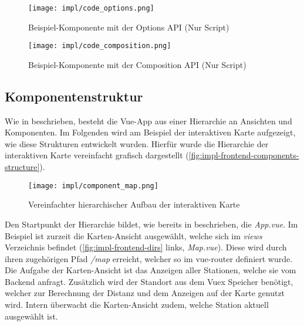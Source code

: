 \begin{figure}[hp]
    \centering
    \texttt{[image: impl/code\_options.png]}
    \caption{Beispiel-Komponente mit der Options API (Nur Script)}
    \label{fig:impl-frontend-vue-api-options}
\end{figure}

\begin{figure}[hp]
    \centering
    \texttt{[image: impl/code\_composition.png]}
    \caption{Beispiel-Komponente mit der Composition API (Nur Script)}
    \label{fig:impl-frontend-vue-api-composition}
\end{figure}


\subsection{Komponentenstruktur}

Wie in  beschrieben, besteht die Vue-App
aus einer Hierarchie an Ansichten und Komponenten. Im Folgenden wird am Beispiel
der interaktiven Karte aufgezeigt, wie diese Strukturen entwickelt wurden.
Hierfür wurde die Hierarchie der interaktiven Karte vereinfacht grafisch
dargestellt (\autoref{fig:impl-frontend-components-structure}).

\begin{figure}[htpb]
    \centering
    \texttt{[image: impl/component\_map.png]}
    \caption{Vereinfachter hierarchischer Aufbau der interaktiven Karte}
    \label{fig:impl-frontend-components-structure}
\end{figure}

Den Startpunkt der Hierarchie bildet, wie bereits in
 beschrieben, die \textit{App.vue}. Im
Beispiel ist zurzeit die Karten-Ansicht ausgewählt, welche sich im
\textit{views} Verzeichnis befindet (\autoref{fig:impl-frontend-dirs} links,
\textit{Map.vue}). Diese wird durch ihren zugehörigen Pfad \textit{/map}
erreicht, welcher so im vue-router definiert wurde. Die Aufgabe der
Karten-Ansicht ist das Anzeigen aller Stationen, welche sie vom Backend anfragt.
Zusätzlich wird der Standort aus dem Vuex Speicher benötigt, welcher zur
Berechnung der Distanz und dem Anzeigen auf der Karte genutzt wird. Intern
überwacht die Karten-Ansicht zudem, welche Station aktuell ausgewählt ist.

